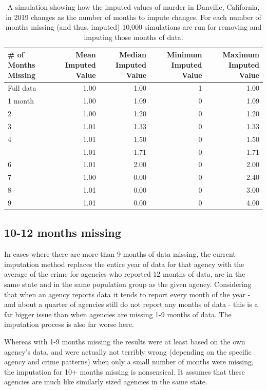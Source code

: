 \documentclass[
  12pt,
  openany]{book}
\begin{document}
\begin{longtable}[t]{lrrrr}
\caption{\label{tab:countyMurderMonthsMissing}A simulation showing how the imputed values of murder in Danville, California, in 2019 changes as the number of months to impute changes. For each number of months missing (and thus, imputed) 10,000 simulations are run for removing and imputing those months of data.}\\
\toprule
\# of Months Missing & Mean Imputed Value & Median Imputed Value & Minimum Imputed Value & Maximum Imputed Value\\
\midrule
Full data & 1.00 & 1.00 & 1 & 1.00\\
1 month & 1.00 & 1.09 & 0 & 1.09\\
2 & 1.00 & 1.20 & 0 & 1.20\\
3 & 1.01 & 1.33 & 0 & 1.33\\
4 & 1.01 & 1.50 & 0 & 1.50\\
\addlinespace
5 & 1.01 & 1.71 & 0 & 1.71\\
6 & 1.01 & 2.00 & 0 & 2.00\\
7 & 1.00 & 0.00 & 0 & 2.40\\
8 & 1.01 & 0.00 & 0 & 3.00\\
9 & 1.01 & 0.00 & 0 & 4.00\\
\bottomrule
\end{longtable}

\subsection{10-12 months missing}\label{months-missing-1}

In cases where there are more than 9 months of data missing, the current imputation method replaces the entire year of data for that agency with the average of the crime for agencies who reported 12 months of data, are in the same state and in the same population group as the given agency. Considering that when an agency reports data it tends to report every month of the year - and about a quarter of agencies still do not report any months of data - this is a far bigger issue than when agencies are missing 1-9 months of data. The imputation process is also far worse here.

Whereas with 1-9 months missing the results were at least based on the own agency's data, and were actually not terribly wrong (depending on the specific agency and crime patterns) when only a small number of months were missing, the imputation for 10+ months missing is nonsensical. It assumes that these agencies are much like similarly sized agencies in the same state.
\end{document}
